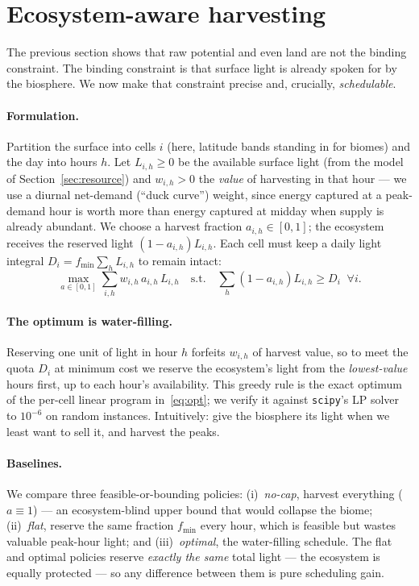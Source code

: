 \section{Ecosystem-aware harvesting}
\label{sec:ecosystem}

The previous section shows that raw potential and even land are not the binding
constraint. The binding constraint is that surface light is already spoken for
by the biosphere. We now make that constraint precise and, crucially,
\emph{schedulable}.

\paragraph{Formulation.} Partition the surface into cells $i$ (here, latitude
bands standing in for biomes) and the day into hours $h$. Let $L_{i,h}\ge 0$ be
the available surface light (from the model of Section~\ref{sec:resource}) and
$w_{i,h}>0$ the \emph{value} of harvesting in that hour --- we use a diurnal
net-demand (``duck curve'') weight, since energy captured at a peak-demand hour
is worth more than energy captured at midday when supply is already abundant.
We choose a harvest fraction $a_{i,h}\in[0,1]$; the ecosystem receives the
reserved light $(1-a_{i,h})L_{i,h}$. Each cell must keep a daily light integral
$D_i = f_{\min}\sum_h L_{i,h}$ to remain intact:
\begin{equation}
\max_{a\in[0,1]} \sum_{i,h} w_{i,h}\, a_{i,h}\, L_{i,h}
\quad\text{s.t.}\quad
\sum_h (1-a_{i,h}) L_{i,h} \ge D_i \;\; \forall i.
\label{eq:opt}
\end{equation}

\paragraph{The optimum is water-filling.} Reserving one unit of light in hour
$h$ forfeits $w_{i,h}$ of harvest value, so to meet the quota $D_i$ at minimum
cost we reserve the ecosystem's light from the \emph{lowest-value} hours first,
up to each hour's availability. This greedy rule is the exact optimum of the
per-cell linear program in~\eqref{eq:opt}; we verify it against
\texttt{scipy}'s LP solver to $10^{-6}$ on random instances. Intuitively: give
the biosphere its light when we least want to sell it, and harvest the peaks.

\paragraph{Baselines.} We compare three feasible-or-bounding policies:
(i)~\emph{no-cap}, harvest everything ($a\equiv 1$) --- an ecosystem-blind
upper bound that would collapse the biome; (ii)~\emph{flat}, reserve the same
fraction $f_{\min}$ every hour, which is feasible but wastes valuable
peak-hour light; and (iii)~\emph{optimal}, the water-filling schedule. The
flat and optimal policies reserve \emph{exactly the same} total light --- the
ecosystem is equally protected --- so any difference between them is pure
scheduling gain.
